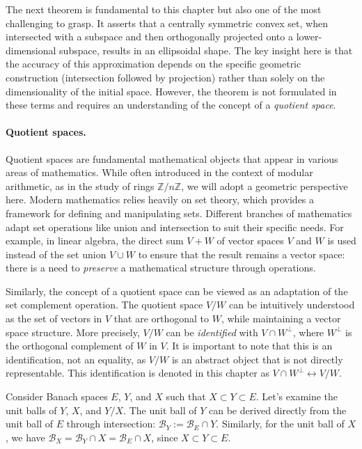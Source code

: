 The next theorem is fundamental to this chapter but also one of the most challenging to grasp. It asserts that a centrally symmetric convex set, when intersected with a subspace and then orthogonally projected onto a lower-dimensional subspace, results in an ellipsoidal shape. The key insight here is that the accuracy of this approximation depends on the specific geometric construction (intersection followed by projection) rather than solely on the dimensionality of the initial space. However, the theorem is not formulated in these terms and requires an understanding of the concept of a \emph{quotient space}.

\paragraph*{Quotient spaces.} Quotient spaces are fundamental mathematical objects that appear in various areas of mathematics.  While often introduced in the context of modular arithmetic, as in the study of rings $\mathbb{Z}/n\mathbb{Z}$, we will adopt a geometric perspective here. Modern mathematics relies heavily on set theory, which provides a framework for defining and manipulating sets.  Different branches of mathematics adapt set operations like union and intersection to suit their specific needs. For example, in linear algebra, the direct sum $V + W$ of vector spaces $V$ and $W$ is used instead of the set union $V \cup W$ to ensure that the result remains a vector space: there is a need to \emph{preserve} a mathematical structure through operations.

Similarly, the concept of a quotient space can be viewed as an adaptation of the set complement operation. The quotient space $V/W$ can be intuitively understood as the set of vectors in $V$ that are orthogonal to $W$, while maintaining a vector space structure.  More precisely, $V/W$ can be \emph{identified} with $V \cap W^\perp$, where $W^\perp$ is the orthogonal complement of $W$ in $V$.  It is important to note that this is an identification, not an equality, as $V/W$ is an abstract object that is not directly representable. This identification is denoted in this chapter as $V \cap W^\perp \longleftrightarrow V/W$.

Consider Banach spaces $E$, $Y$, and $X$ such that $X \subset Y \subset E$. Let's examine the unit balls of $Y$, $X$, and $Y/X$.
The unit ball of $Y$ can be derived directly from the unit ball of $E$ through intersection: $\mathcal{B}_Y := \mathcal{B}_E \cap Y$.  Similarly, for the unit ball of $X$, we have $\mathcal{B}_X = \mathcal{B}_Y \cap X = \mathcal{B}_E \cap X$, since $X \subset Y \subset E$.

